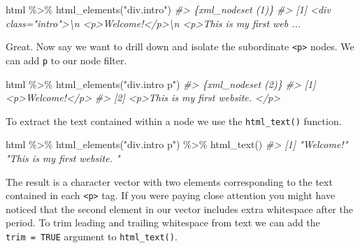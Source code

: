 \documentclass[
]{article}
\newenvironment{Shaded}{\begin{snugshade}}{\end{snugshade}}
\newcommand{\CommentTok}[1]{\textcolor[rgb]{0.56,0.35,0.01}{\textit{#1}}}
\newcommand{\FunctionTok}[1]{\textcolor[rgb]{0.00,0.00,0.00}{#1}}
\newcommand{\NormalTok}[1]{#1}
\newcommand{\SpecialCharTok}[1]{\textcolor[rgb]{0.00,0.00,0.00}{#1}}
\newcommand{\StringTok}[1]{\textcolor[rgb]{0.31,0.60,0.02}{#1}}
\begin{document}
\begin{Shaded}
\begin{Highlighting}[]
\NormalTok{html }\SpecialCharTok{\%\textgreater{}\%}
    \FunctionTok{html\_elements}\NormalTok{(}\StringTok{"div.intro"}\NormalTok{)}
\CommentTok{\#\textgreater{} \{xml\_nodeset (1)\}}
\CommentTok{\#\textgreater{} [1] \textless{}div class="intro"\textgreater{}\textbackslash{}n      \textless{}p\textgreater{}Welcome!\textless{}/p\textgreater{}\textbackslash{}n      \textless{}p\textgreater{}This is my first web ...}
\end{Highlighting}
\end{Shaded}

Great. Now say we want to drill down and isolate the subordinate \texttt{\textless{}p\textgreater{}} nodes. We can add \texttt{p} to our node filter.

\begin{Shaded}
\begin{Highlighting}[]
\NormalTok{html }\SpecialCharTok{\%\textgreater{}\%}
    \FunctionTok{html\_elements}\NormalTok{(}\StringTok{"div.intro p"}\NormalTok{)}
\CommentTok{\#\textgreater{} \{xml\_nodeset (2)\}}
\CommentTok{\#\textgreater{} [1] \textless{}p\textgreater{}Welcome!\textless{}/p\textgreater{}}
\CommentTok{\#\textgreater{} [2] \textless{}p\textgreater{}This is my first website. \textless{}/p\textgreater{}}
\end{Highlighting}
\end{Shaded}

To extract the text contained within a node we use the \texttt{html\_text()} function.

\begin{Shaded}
\begin{Highlighting}[]
\NormalTok{html }\SpecialCharTok{\%\textgreater{}\%}
    \FunctionTok{html\_elements}\NormalTok{(}\StringTok{"div.intro p"}\NormalTok{) }\SpecialCharTok{\%\textgreater{}\%}
    \FunctionTok{html\_text}\NormalTok{()}
\CommentTok{\#\textgreater{} [1] "Welcome!"                   "This is my first website. "}
\end{Highlighting}
\end{Shaded}

The result is a character vector with two elements corresponding to the text contained in each \texttt{\textless{}p\textgreater{}} tag. If you were paying close attention you might have noticed that the second element in our vector includes extra whitespace after the period. To trim leading and trailing whitespace from text we can add the \texttt{trim\ =\ TRUE} argument to \texttt{html\_text()}.
\end{document}
